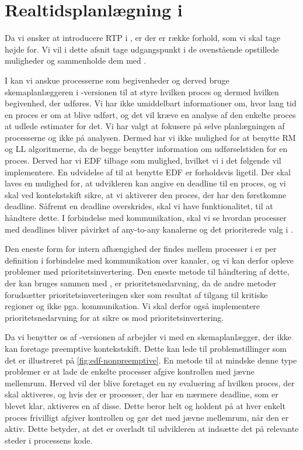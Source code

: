 \section{Realtidsplanlægning i \pycsp}
\label{sec:rtp-pycsp}
Da vi ønsker at introducere RTP i \pycsp, er der er række forhold, som vi skal tage højde for. Vi vil i dette afsnit tage udgangspunkt i de ovenstående opstillede muligheder og sammenholde dem med \pycsp. 

I \pycsp kan vi anskue processerne som begivenheder og derved bruge skemaplanlæggeren i -versionen til at styre hvilken proces og dermed hvilken begivenhed, der udføres. Vi har ikke umiddelbart informationer om, hvor lang tid en proces er om at blive udført, og det vil kræve en analyse af den enkelte proces at udlede estimater for det. Vi har valgt at fokusere på selve planlægningen af processerne og ikke på analysen. Dermed har vi ikke mulighed for at benytte RM og LL algoritmerne, da de begge benytter information om udførselstiden for en proces. Derved har vi EDF tilbage som mulighed, hvilket vi i det følgende vil implementere. En udvidelse af \pycsp til at benytte EDF er forholdsvis ligetil. Der skal laves en mulighed for, at udvikleren kan angive en deadline til en proces, og vi skal ved kontekstskift sikre, at vi aktiverer den proces, der har den førstkomne deadline. Såfremt en deadline overskrides, skal vi have funktionalitet, til at håndtere dette. 
I forbindelse med kommunikation, skal vi se hvordan processer med deadlines bliver påvirket af  any-to-any kanalerne og det prioriterede valg i .

Den eneste form for intern afhængighed der findes mellem processer i \pycsp er per definition i forbindelse med kommunikation over kanaler, og vi kan derfor opleve problemer med prioritetsinvertering. Den eneste metode til håndtering af dette, der kan bruges sammen med \pycsp, er prioritetsnedarvning, da de andre metoder forudsætter prioritetsinverteringen  sker som resultat af tilgang til kritiske regioner og ikke pga. kommunikation. Vi skal derfor også implementere prioritetsnedarvning for at sikre os mod prioritetsinvertering. 

Da vi benytter os af -versionen af \pycsp arbejder vi med en skemaplanlægger, der ikke kan foretage preemptive kontekstskift. Dette kan lede til problemstillinger som det er illustreret på \cref{fig:edf-nonpreemptive}. En metode til at mindske denne type problemer er at lade de enkelte processer afgive kontrollen med jævne mellemrum. Herved vil der blive foretaget en ny evaluering af hvilken proces, der skal aktiveres, og hvis der er processer, der har en nærmere deadline, som er blevet klar, aktiveres en af disse. Dette beror helt og holdent på at hver enkelt proces frivilligt afgiver kontrollen og gør det med jævne mellemrum, når den er aktiv. Dette betyder, at det er overladt til udvikleren at indsætte det på relevante steder i processens kode. 

